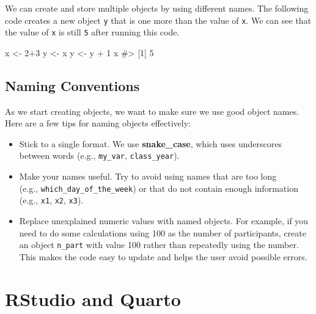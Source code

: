 \documentclass[
  letterpaper,
]{latex/krantz}
\makeatletter
\newenvironment{Shaded}{\begin{snugshade}}{\end{snugshade}}
\newcommand{\CommentTok}[1]{\textcolor[rgb]{0.37,0.37,0.37}{#1}}
\newcommand{\DecValTok}[1]{\textcolor[rgb]{0.68,0.00,0.00}{#1}}
\newcommand{\NormalTok}[1]{\textcolor[rgb]{0.00,0.23,0.31}{#1}}
\newcommand{\OtherTok}[1]{\textcolor[rgb]{0.00,0.23,0.31}{#1}}
\newcommand{\SpecialCharTok}[1]{\textcolor[rgb]{0.37,0.37,0.37}{#1}}
\providecommand{\tightlist}{%
  \setlength{\itemsep}{0pt}\setlength{\parskip}{0pt}}\usepackage{longtable,booktabs,array}
\newenvironment{kframe}{%
\medskip{}
\setlength{\fboxsep}{.8em}
 \def\at@end@of@kframe{}%
 \ifinner\ifhmode%
  \def\at@end@of@kframe{\end{minipage}}%
  \begin{minipage}{\columnwidth}%
 \fi\fi%
 \def\FrameCommand##1{\hskip\@totalleftmargin \hskip-\fboxsep
 \colorbox{shadecolor}{##1}\hskip-\fboxsep
     \hskip-\linewidth \hskip-\@totalleftmargin \hskip\columnwidth}%
 \MakeFramed {\advance\hsize-\width
   \@totalleftmargin\z@ \linewidth\hsize
   \@setminipage}}%
 {\par\unskip\endMakeFramed%
 \at@end@of@kframe}
\renewenvironment{Shaded}{\begin{kframe}}{\end{kframe}}
\makeatother
\begin{document}
We can create and store multiple objects by using different names. The
following code creates a new object \texttt{y} that is one more than the
value of \texttt{x}. We can see that the value of \texttt{x} is still
\texttt{5} after running this code.

\begin{Shaded}
\begin{Highlighting}[]
\NormalTok{x }\OtherTok{\textless{}{-}} \DecValTok{2}\SpecialCharTok{+}\DecValTok{3}
\NormalTok{y }\OtherTok{\textless{}{-}}\NormalTok{ x}
\NormalTok{y }\OtherTok{\textless{}{-}}\NormalTok{ y }\SpecialCharTok{+} \DecValTok{1}
\NormalTok{x}
\CommentTok{\#\textgreater{} [1] 5}
\end{Highlighting}
\end{Shaded}

\subsection{Naming Conventions}\label{naming-conventions}

As we start creating objects, we want to make sure we use good object
names. Here are a few tips for naming objects
effectively:

\begin{itemize}
\tightlist
\item
  Stick to a single format. We use \textbf{snake\_case}, which uses
  underscores between words (e.g., \texttt{my\_var},
  \texttt{class\_year}).\\
\item
  Make your names useful. Try to avoid using names that are too long\\
  (e.g., \texttt{which\_day\_of\_the\_week}) or that do not contain
  enough information (e.g., \texttt{x1}, \texttt{x2}, \texttt{x3}).\\
\item
  Replace unexplained numeric values with named objects. For example, if
  you need to do some calculations using 100 as the number of
  participants, create an object \texttt{n\_part} with value 100 rather
  than repeatedly using the number. This makes the code easy to update
  and helps the user avoid possible errors.
\end{itemize}

\section{RStudio and Quarto}\label{rstudio-and-quarto}
\end{document}
